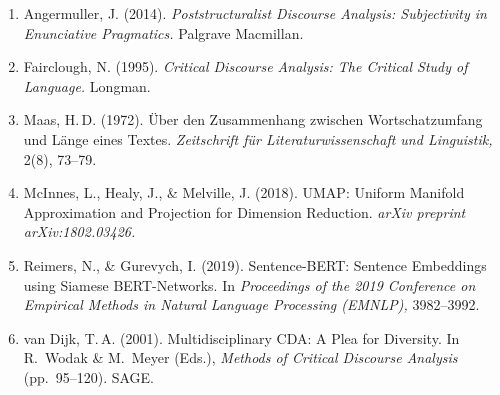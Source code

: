 \documentclass[12pt, a4paper]{article}
\begin{document}
\begin{enumerate}
  \item Angermuller, J. (2014). \textit{Poststructuralist Discourse
  Analysis: Subjectivity in Enunciative Pragmatics.} Palgrave Macmillan.

  \item Fairclough, N. (1995). \textit{Critical Discourse Analysis: The
  Critical Study of Language.} Longman.

  \item Maas, H.\,D. (1972). Über den Zusammenhang zwischen
  Wortschatzumfang und Länge eines Textes. \textit{Zeitschrift für
  Literaturwissenschaft und Linguistik,} 2(8), 73--79.

  \item McInnes, L., Healy, J., \& Melville, J. (2018). UMAP: Uniform
  Manifold Approximation and Projection for Dimension Reduction.
  \textit{arXiv preprint arXiv:1802.03426.}

  \item Reimers, N., \& Gurevych, I. (2019). Sentence-BERT: Sentence
  Embeddings using Siamese BERT-Networks. In \textit{Proceedings of the
  2019 Conference on Empirical Methods in Natural Language Processing
  (EMNLP),} 3982--3992.

  \item van Dijk, T.\,A. (2001). Multidisciplinary CDA: A Plea for
  Diversity. In R.~Wodak \& M.~Meyer (Eds.), \textit{Methods of Critical
  Discourse Analysis} (pp.~95--120). SAGE.
\end{enumerate}
\end{document}
